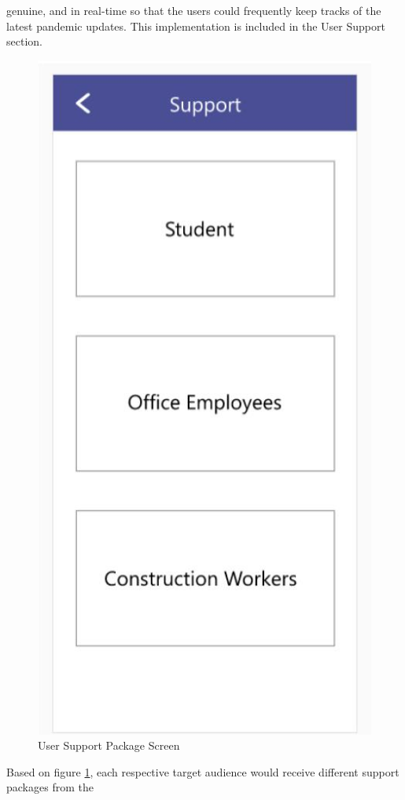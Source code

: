 \begin{enumerate}[a)]
          genuine, and in real-time so that the users could frequently keep tracks of the latest pandemic updates.
          This implementation is included in the User Support section.
          \begin{figure}[H]
            \centering
            \includegraphics[scale=1]{img/prototype/iter3-proto-6.png}
            \caption{User Support Package Screen}
            \label{fig:iter3-proto-6}
          \end{figure} 
          \par Based on figure \ref{fig:iter3-proto-6}, each respective target audience would receive different support packages from the

\end{enumerate}
